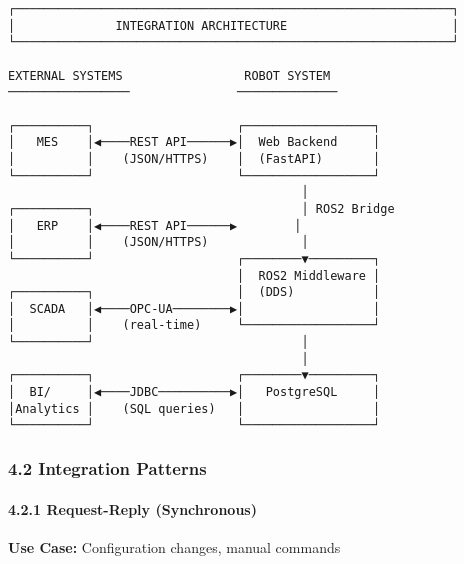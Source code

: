 \documentclass[
]{article}
\begin{document}
\begin{verbatim}
┌─────────────────────────────────────────────────────────────┐
│              INTEGRATION ARCHITECTURE                       │
└─────────────────────────────────────────────────────────────┘

EXTERNAL SYSTEMS                 ROBOT SYSTEM
─────────────────               ──────────────

┌──────────┐                    ┌──────────────────┐
│   MES    │◀────REST API──────▶│  Web Backend     │
│          │    (JSON/HTTPS)    │  (FastAPI)       │
└──────────┘                    └──────────────────┘
                                         │
┌──────────┐                             │ ROS2 Bridge
│   ERP    │◀────REST API──────▶        │
│          │    (JSON/HTTPS)             │
└──────────┘                    ┌────────▼─────────┐
                                │  ROS2 Middleware │
┌──────────┐                    │  (DDS)           │
│  SCADA   │◀────OPC-UA────────▶│                  │
│          │    (real-time)     └──────────────────┘
└──────────┘                             │
                                         │
┌──────────┐                    ┌────────▼─────────┐
│  BI/     │◀────JDBC──────────▶│   PostgreSQL     │
│Analytics │    (SQL queries)   │                  │
└──────────┘                    └──────────────────┘
\end{verbatim}

\hypertarget{integration-patterns}{%
\subsubsection{4.2 Integration Patterns}\label{integration-patterns}}

\hypertarget{request-reply-synchronous}{%
\paragraph{4.2.1 Request-Reply
(Synchronous)}\label{request-reply-synchronous}}

\textbf{Use Case:} Configuration changes, manual commands
\end{document}
